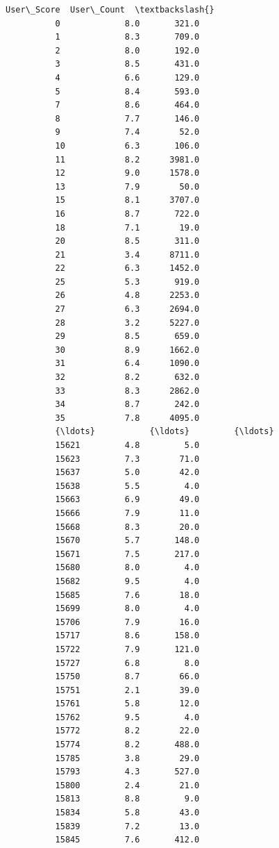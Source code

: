 \documentclass[11pt]{article}
\begin{document}
\begin{Verbatim}[commandchars=\\\{\}]
                 User\_Score  User\_Count  \textbackslash{}
          0             8.0       321.0   
          1             8.3       709.0   
          2             8.0       192.0   
          3             8.5       431.0   
          4             6.6       129.0   
          5             8.4       593.0   
          7             8.6       464.0   
          8             7.7       146.0   
          9             7.4        52.0   
          10            6.3       106.0   
          11            8.2      3981.0   
          12            9.0      1578.0   
          13            7.9        50.0   
          15            8.1      3707.0   
          16            8.7       722.0   
          18            7.1        19.0   
          20            8.5       311.0   
          21            3.4      8711.0   
          22            6.3      1452.0   
          25            5.3       919.0   
          26            4.8      2253.0   
          27            6.3      2694.0   
          28            3.2      5227.0   
          29            8.5       659.0   
          30            8.9      1662.0   
          31            6.4      1090.0   
          32            8.2       632.0   
          33            8.3      2862.0   
          34            8.7       242.0   
          35            7.8      4095.0   
          {\ldots}           {\ldots}         {\ldots}   
          15621         4.8         5.0   
          15623         7.3        71.0   
          15637         5.0        42.0   
          15638         5.5         4.0   
          15663         6.9        49.0   
          15666         7.9        11.0   
          15668         8.3        20.0   
          15670         5.7       148.0   
          15671         7.5       217.0   
          15680         8.0         4.0   
          15682         9.5         4.0   
          15685         7.6        18.0   
          15699         8.0         4.0   
          15706         7.9        16.0   
          15717         8.6       158.0   
          15722         7.9       121.0   
          15727         6.8         8.0   
          15750         8.7        66.0   
          15751         2.1        39.0   
          15761         5.8        12.0   
          15762         9.5         4.0   
          15772         8.2        22.0   
          15774         8.2       488.0   
          15785         3.8        29.0   
          15793         4.3       527.0   
          15800         2.4        21.0   
          15813         8.8         9.0   
          15834         5.8        43.0   
          15839         7.2        13.0   
          15845         7.6       412.0   
          

\end{Verbatim}
\end{document}
